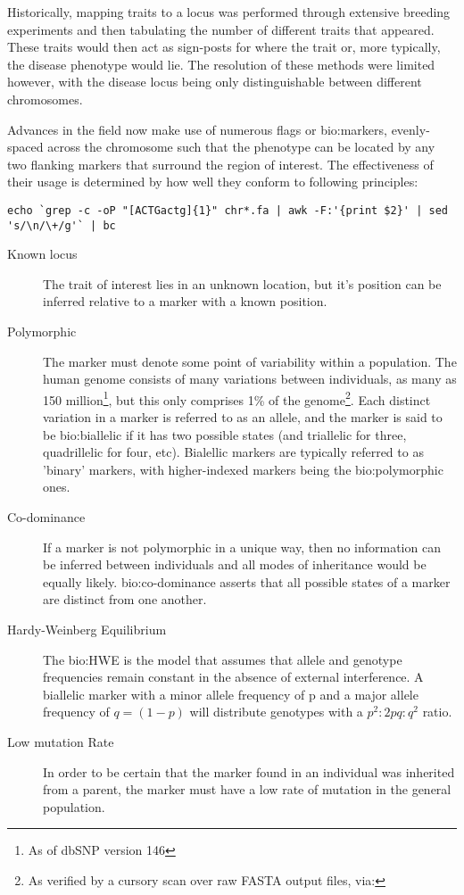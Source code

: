 Historically, mapping traits to a locus was performed through extensive breeding experiments and then tabulating the number of different traits that appeared. These traits would then act as sign-posts for where the trait or, more typically, the disease phenotype would lie. The resolution of these methods were limited however, with the disease locus being only distinguishable between different chromosomes.

Advances in the field now make use of numerous flags or \gls{bio:markers}, evenly-spaced across the chromosome such that the phenotype can be located by any two flanking markers that surround the region of interest. The effectiveness of their usage  is determined by how well they conform to following principles:

\begin{lrbox}\myVerb\scriptsize
    \verb!echo `grep -c -oP "[ACTGactg]{1}" chr*.fa | awk -F:'{print $2}' | sed 's/\n/\+/g'` | bc!
\end{lrbox}%

\begin{description}
\item[Known locus]{
	The trait of interest lies in an unknown location, but it's position can be inferred relative to a marker with a known position.
}
\item[Polymorphic]
{
	The marker must denote some point of variability within a population. The human genome consists of many variations between individuals, as many as 150 million\footnote{As of dbSNP version 146}, but this only comprises 1\% of the genome\footnote{As verified by a cursory scan over raw FASTA output files, via: \usebox\myVerb}. Each distinct variation in a marker is referred to as an allele, and the marker is said to be \gls{bio:biallelic} if it has two possible states (and triallelic for three, quadrillelic for four, etc). Bialellic markers are typically referred to as 'binary' markers, with higher-indexed markers being the \gls{bio:polymorphic} ones.
}
\item[Co-dominance]{If a marker is not polymorphic in a unique way, then no information can be inferred between individuals and all modes of inheritance would be equally likely.  \gls{bio:co-dominance} asserts that all possible states of a marker are distinct from one another.}
\item[Hardy-Weinberg Equilibrium]{The \gls{bio:HWE} is the model that assumes that allele and genotype frequencies remain constant in the absence of external interference. A biallelic marker with a minor allele frequency of p and a major allele frequency of \(q = (1-p)\) will distribute genotypes with a \(p^2 : 2pq : q^2\) ratio.}
\item[Low mutation Rate]{In order to be  certain that the marker found in an individual was inherited from a parent, the marker must have a low rate of mutation in the general population.}
\end{description}

